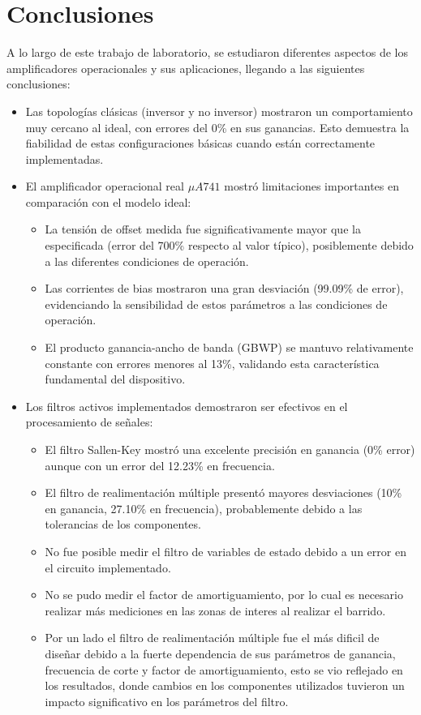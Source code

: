 \section{Conclusiones}

A lo largo de este trabajo de laboratorio, se estudiaron diferentes aspectos de los amplificadores operacionales y sus aplicaciones, llegando a las siguientes conclusiones:

\begin{itemize}
    \item Las topologías clásicas (inversor y no inversor) mostraron un comportamiento muy cercano al ideal, con errores del 0\% en sus ganancias. Esto demuestra la fiabilidad de estas configuraciones básicas cuando están correctamente implementadas.
    
    \item El amplificador operacional real $\mu A741$ mostró limitaciones importantes en comparación con el modelo ideal:
    \begin{itemize}
        \item La tensión de offset medida fue significativamente mayor que la especificada (error del 700\% respecto al valor típico), posiblemente debido a las diferentes condiciones de operación.
        \item Las corrientes de bias mostraron una gran desviación (99.09\% de error), evidenciando la sensibilidad de estos parámetros a las condiciones de operación.
        \item El producto ganancia-ancho de banda (GBWP) se mantuvo relativamente constante con errores menores al 13\%, validando esta característica fundamental del dispositivo.
    \end{itemize}
    
    \item Los filtros activos implementados demostraron ser efectivos en el procesamiento de señales:
    \begin{itemize}
        \item El filtro Sallen-Key mostró una excelente precisión en ganancia (0\% error) aunque con un error del 12.23\% en frecuencia.
        \item El filtro de realimentación múltiple presentó mayores desviaciones (10\% en ganancia, 27.10\% en frecuencia), probablemente debido a las tolerancias de los componentes.
        \item No fue posible medir el filtro de variables de estado debido a un error en el circuito implementado.
        \item No se pudo medir el factor de amortiguamiento, por lo cual es necesario realizar más mediciones en las zonas de interes al realizar el barrido.
        \item Por un lado el filtro de realimentación múltiple fue el más dificil de diseñar debido a la fuerte dependencia de sus parámetros de ganancia, frecuencia de corte y factor de amortiguamiento, esto se vio reflejado en los resultados, donde cambios en los componentes utilizados tuvieron un impacto significativo en los parámetros del filtro.
    \end{itemize}
    

\end{itemize}
